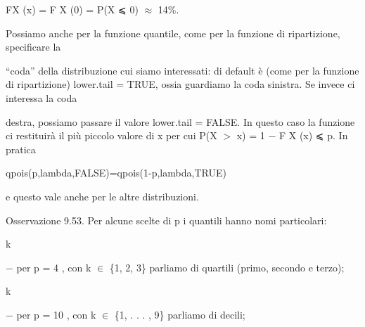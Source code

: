 \documentclass[a4paper,portrait,12pt]{article}
\begin{document}
\begin{flushleft}
FX (x) = F X (0) = P(X ⩽ 0) $\approx$ 14\%.
\end{flushleft}


\begin{flushleft}
Possiamo anche per la funzione quantile, come per la funzione di ripartizione, specificare la
\end{flushleft}


\begin{flushleft}
{``}coda'' della distribuzione cui siamo interessati: di default \`{e} (come per la funzione di ripartizione) lower.tail = TRUE, ossia guardiamo la coda sinistra. Se invece ci interessa la coda
\end{flushleft}


\begin{flushleft}
destra, possiamo passare il valore lower.tail = FALSE. In questo caso la funzione ci restituir\`{a} il più piccolo valore di x per cui P(X $>$ x) = 1 $-$ F X (x) ⩽ p. In pratica
\end{flushleft}





\begin{flushleft}
qpois(p,lambda,FALSE)=qpois(1-p,lambda,TRUE)
\end{flushleft}


\begin{flushleft}
e questo vale anche per le altre distribuzioni.
\end{flushleft}


\begin{flushleft}
Osservazione 9.53. Per alcune scelte di p i quantili hanno nomi particolari:
\end{flushleft}


\begin{flushleft}
k
\end{flushleft}





\begin{flushleft}
$-$ per p = 4 , con k $\in$ \{1, 2, 3\} parliamo di quartili (primo, secondo e terzo);
\end{flushleft}


\begin{flushleft}
k
\end{flushleft}





\begin{flushleft}
$-$ per p = 10 , con k $\in$ \{1, . . . , 9\} parliamo di decili;
\end{flushleft}
\end{document}

